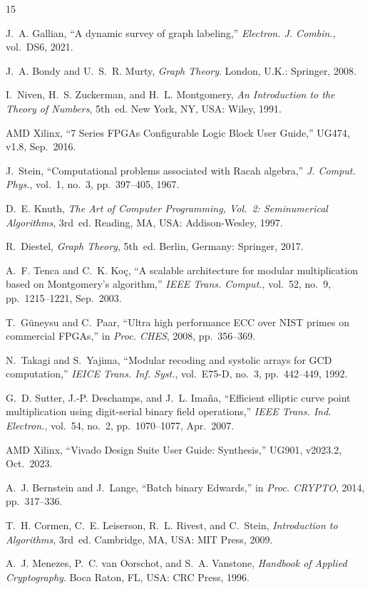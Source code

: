 \documentclass[lettersize,journal]{IEEEtran}
\begin{document}
\begin{thebibliography}{15}


J.~A. Gallian, ``A dynamic survey of graph labeling,'' \textit{Electron. J. Combin.}, vol.~DS6, 2021.

J.~A. Bondy and U.~S.~R. Murty, \textit{Graph Theory}. London, U.K.: Springer, 2008.

I.~Niven, H.~S. Zuckerman, and H.~L. Montgomery, \textit{An Introduction to the Theory of Numbers}, 5th~ed. New York, NY, USA: Wiley, 1991.

AMD Xilinx, ``7 Series FPGAs Configurable Logic Block User Guide,'' UG474, v1.8, Sep.~2016.

J.~Stein, ``Computational problems associated with Racah algebra,'' \textit{J. Comput. Phys.}, vol.~1, no.~3, pp.~397--405, 1967.

D.~E. Knuth, \textit{The Art of Computer Programming, Vol.~2: Seminumerical Algorithms}, 3rd~ed. Reading, MA, USA: Addison-Wesley, 1997.

R.~Diestel, \textit{Graph Theory}, 5th~ed. Berlin, Germany: Springer, 2017.

A.~F. Tenca and C.~K. Ko\c{c}, ``A scalable architecture for modular multiplication based on Montgomery's algorithm,'' \textit{IEEE Trans. Comput.}, vol.~52, no.~9, pp.~1215--1221, Sep.~2003.

T.~G\"{u}neysu and C.~Paar, ``Ultra high performance ECC over NIST primes on commercial FPGAs,'' in \textit{Proc. CHES}, 2008, pp.~356--369.

N.~Takagi and S.~Yajima, ``Modular recoding and systolic arrays for GCD computation,'' \textit{IEICE Trans. Inf. Syst.}, vol.~E75-D, no.~3, pp.~442--449, 1992.

G.~D. Sutter, J.-P. Deschamps, and J.~L. Ima\~{n}a, ``Efficient elliptic curve point multiplication using digit-serial binary field operations,'' \textit{IEEE Trans. Ind. Electron.}, vol.~54, no.~2, pp.~1070--1077, Apr.~2007.

AMD Xilinx, ``Vivado Design Suite User Guide: Synthesis,'' UG901, v2023.2, Oct.~2023.

A.~J. Bernstein and J.~Lange, ``Batch binary Edwards,'' in \textit{Proc. CRYPTO}, 2014, pp.~317--336.

T.~H. Cormen, C.~E. Leiserson, R.~L. Rivest, and C.~Stein, \textit{Introduction to Algorithms}, 3rd~ed. Cambridge, MA, USA: MIT Press, 2009.

A.~J. Menezes, P.~C. van Oorschot, and S.~A. Vanstone, \textit{Handbook of Applied Cryptography}. Boca Raton, FL, USA: CRC Press, 1996.

\end{thebibliography}
\end{document}
